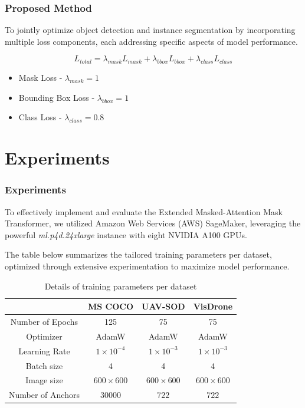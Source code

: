 \documentclass{beamer}
\begin{document}
\begin{frame}[t]
  \frametitle{Proposed Method}
  To jointly optimize object detection and instance segmentation by incorporating multiple loss components, each addressing specific aspects of model 
  performance.

  \[L_{total} = \lambda_{mask} L_{mask} + \lambda_{bbox} L_{bbox} + \lambda_{class} L_{class}\]

  \begin{itemize}
    \item Mask Loss - \(\lambda_{mask} = 1\)
    \item Bounding Box Loss - \(\lambda_{bbox} = 1\)
    \item Class Loss - \(\lambda_{class} = 0.8\)
  \end{itemize}

\end{frame}

\section{Experiments}
\begin{frame}[t]
  \frametitle{Experiments}
  To effectively implement and evaluate the Extended Masked-Attention Mask Transformer, we utilized Amazon Web Services (AWS) SageMaker, 
  leveraging the powerful \textit{ml.p4d.24xlarge} instance with eight NVIDIA A100 GPUs.

  \vspace{1cm}
  
  The table below summarizes the tailored training parameters per dataset, optimized through extensive experimentation to maximize model performance.

  \begin{table}[h]
    \scriptsize
    \centering
    \begin{tabular}{|c|c|c|c|}
        \hline
        &                   \textbf{MS COCO}      & \textbf{UAV-SOD}     & \textbf{VisDrone}            \\ \hline
        Number of Epochs   & 125                  & 75                   & 75                           \\ \hline
        Optimizer          & AdamW                & AdamW                & AdamW                        \\ \hline
        Learning Rate      & $1 \times 10^{-4}$   & $1 \times 10^{-3}$   & $1 \times 10^{-3}$           \\ \hline
        Batch size         & 4                    &  4                   & 4                            \\ \hline
        Image size         & $600\times600$       &  $600\times600$      & $600\times600$               \\ \hline
        Number of Anchors  & $30000$              &  $722$               & $722$                        \\ \hline
    \end{tabular}
    \caption{Details of training parameters per dataset}
    \label{tab:training_parameters}
  \end{table}
\end{frame}
\end{document}
